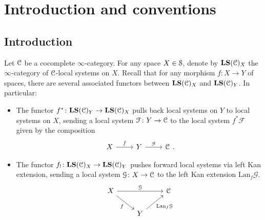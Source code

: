 \documentclass[main.tex]{subfiles}
\begin{document}
\section{Introduction and conventions}
\label{sec:introduction_and_conventions}

\subsection{Introduction}
\label{ssc:introduction}

Let $\category{C}$ be a cocomplete $\infty$-category. For any space $X \in \S$, denote by $\LS(\category{C})_{X}$ the $\infty$-category of $\category{C}$-local systems on $X$. Recall that for any morphism $f\colon X \to Y$ of spaces, there are several associated functors between $\LS(\category{C})_{X}$ and $\LS(\category{C})_{Y}$. In particular:
\begin{itemize}
  \item The functor $f^{*}\colon \LS(\category{C})_{Y} \to \LS(\category{C})_{X}$ pulls back local systems on $Y$ to local systems on $X$, sending a local system $\mathcal{F}\colon Y \to \category{C}$ to the local system $f^{*}\mathcal{F}$ given by the composition
    \begin{equation*}
      \begin{tikzcd}
        X
        \arrow[r, "f"]
        & Y
        \arrow[r, "\mathcal{F}"]
        & \category{C}
      \end{tikzcd}.
    \end{equation*}

  \item The functor $f_{!}\colon \LS(\category{C})_{X} \to \LS(\category{C})_{Y}$ pushes forward local systems via left Kan extension, sending a local system $\mathcal{G}\colon X \to \category{C}$ to the left Kan extension $\mathrm{Lan}_{f}\mathcal{G}$.
    \begin{equation*}
      \begin{tikzcd}
        X
        \arrow[rr, "\mathcal{G}"]
        \arrow[dr, swap, "f"]
        && \category{C}
        \\
        & Y
        \arrow[ur, swap, "\mathrm{Lan}_{f}\mathcal{G}"]
      \end{tikzcd}
    \end{equation*}
\end{itemize}
\end{document}
